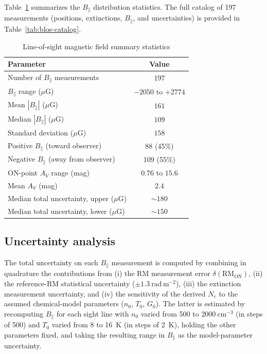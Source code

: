 \documentclass[twocolumn]{aastex631}
\begin{document}
Table~\ref{tab:blos-summary} summarizes the $B_\parallel$ distribution statistics. The full catalog of 197 measurements (positions, extinctions, $B_\parallel$, and uncertainties) is provided in Table~\ref{tab:blos-catalog}.

\begin{table}[htbp]
\centering
\caption{Line-of-sight magnetic field summary statistics}
\label{tab:blos-summary}
\begin{tabular}{lc}
\toprule
Parameter & Value \\
\midrule
Number of $B_\parallel$ measurements & 197 \\
\midrule
$B_\parallel$ range ($\mu$G) & $-2050$ to $+2774$ \\
Mean $|B_\parallel|$ ($\mu$G) & $161$ \\
Median $|B_\parallel|$ ($\mu$G) & $109$ \\
Standard deviation ($\mu$G) & $158$ \\
\midrule
Positive $B_\parallel$ (toward observer) & 88 (45\%) \\
Negative $B_\parallel$ (away from observer) & 109 (55\%) \\
\midrule
ON-point $A_V$ range (mag) & $0.76$ to $15.6$ \\
Mean $A_V$ (mag) & $2.4$ \\
\midrule
Median total uncertainty, upper ($\mu$G) & $\sim180$ \\
Median total uncertainty, lower ($\mu$G) & $\sim150$ \\
\bottomrule
\end{tabular}
\end{table}

\subsection{Uncertainty analysis}

The total uncertainty on each $B_\parallel$ measurement is computed by combining in quadrature the contributions from (i) the RM measurement error $\delta(\mathrm{RM_{ON}})$, (ii) the reference-RM statistical uncertainty ($\pm 1.3~\mathrm{rad\,m^{-2}}$), (iii) the extinction measurement uncertainty, and (iv) the sensitivity of the derived $N_e$ to the assumed chemical-model parameters ($n_0$, $T_0$, $G_0$). The latter is estimated by recomputing $B_\parallel$ for each sight line with $n_0$ varied from 500 to $2000~\mathrm{cm^{-3}}$ (in steps of 500) and $T_0$ varied from 8 to 16~K (in steps of 2~K), holding the other parameters fixed, and taking the resulting range in $B_\parallel$ as the model-parameter uncertainty.
\end{document}
